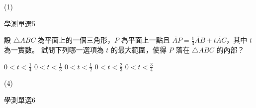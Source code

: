\begin{QUESTIONS}
\begin{QUESTION}
        \begin{QANS}
            (1)
        \end{QANS}
        \begin{QSOLLIST}
        \end{QSOLLIST}
        \begin{QEMPTYSPACE}
        \end{QEMPTYSPACE}
    \end{QUESTION}
    \begin{QUESTION}
        \begin{ExamInfo}{93}{學測}{單選}{5}
        \end{ExamInfo}
        \begin{ExamAnsRateInfo}{61}{88}{62}{33}
        \end{ExamAnsRateInfo}
        \begin{QBODY}
            設 $\triangle ABC$ 為平面上的一個三角形，$P$ 為平面上一點且 $\lvec{AP}= \frac{1}{3}\lvec{AB}+ t\lvec{AC}$，其中 $t$為一實數。
            試問下列哪一選項為 $t$ 的最大範圍，使得 $P$ 落在 $\triangle ABC$ 的內部？ 
            \begin{QOPS} 
                \QOP $0<t < \frac{1}{4}$ 
                \QOP $0 < t < \frac{1}{3}$ 
                \QOP $0 < t <\frac{1}{2}$ 
                \QOP $0 < t < \frac{2}{3}$ 
                \QOP $0 < t < \frac{3}{4}$
            \end{QOPS}
        \end{QBODY}
        \begin{QFROMS}
        \end{QFROMS}
        \begin{QTAGS}\end{QTAGS}
        \begin{QANS}
            (4)
        \end{QANS}
        \begin{QSOLLIST}
        \end{QSOLLIST}
        \begin{QEMPTYSPACE}
        \end{QEMPTYSPACE}
    \end{QUESTION}
    \begin{QUESTION}
        \begin{ExamInfo}{93}{學測}{單選}{6}
        \end{ExamInfo}
        \begin{ExamAnsRateInfo}{26}{42}{27}{9}
        \end{ExamAnsRateInfo}

\end{QUESTION}
\end{QUESTIONS}

